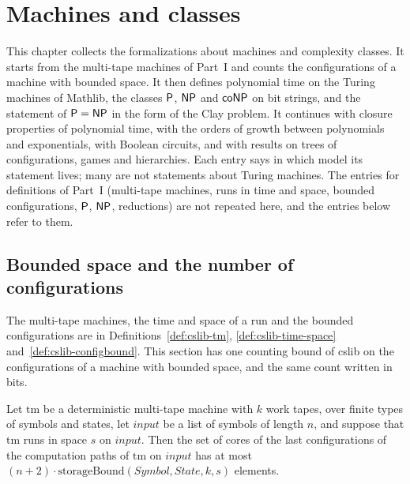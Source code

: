 \chapter{Machines and classes}
\label{chap:machines}

This chapter collects the formalizations about machines and complexity classes. It starts from the
multi-tape machines of Part~I and counts the configurations of a machine with bounded space. It then
defines polynomial time on the Turing machines of Mathlib, the classes $\mathsf{P}$, $\mathsf{NP}$ and
$\mathsf{coNP}$ on bit strings, and the statement of $\mathsf{P} = \mathsf{NP}$ in the form of the Clay problem. It continues with
closure properties of polynomial time, with the orders of growth between polynomials and exponentials,
with Boolean circuits, and with results on trees of configurations, games and hierarchies. Each entry
says in which model its statement lives; many are not statements about Turing machines. The entries
for definitions of Part~I (multi-tape machines, runs in time and space, bounded configurations,
$\mathsf{P}$, $\mathsf{NP}$, reductions) are not repeated here, and the entries below refer to them.


\section{Bounded space and the number of configurations}
\label{sec:machines-space}

The multi-tape machines, the time and space of a run and the bounded configurations are in
Definitions~\ref{def:cslib-tm}, \ref{def:cslib-time-space} and~\ref{def:cslib-configbound}. This
section has one counting bound of cslib on the configurations of a machine with bounded space, and
the same count written in bits.

\begin{theorem}
  \label{thm:machines-cores}
  \leanok
  Let $\mathrm{tm}$ be a deterministic multi-tape machine with $k$ work tapes, over finite types of
  symbols and states, let $\mathit{input}$ be a list of symbols of length $n$, and suppose that
  $\mathrm{tm}$ runs in space $s$ on $\mathit{input}$. Then the set of cores of the last
  configurations of the computation paths of $\mathrm{tm}$ on $\mathit{input}$ has at most
  $(n + 2) \cdot \mathrm{storageBound}(\mathit{Symbol}, \mathit{State}, k, s)$ elements.
\end{theorem}

